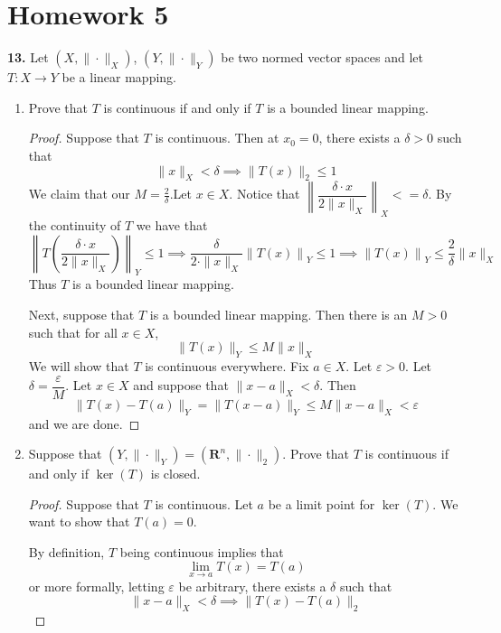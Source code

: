 \documentclass{article}
\newcommand{\R}{\mathbf{R}}
\theoremstyle{plain} %
\numberwithin{thm}{section} %
\theoremstyle{definition}
\begin{document}
    \setcounter{section}{4}
    \section{Homework 5}
    \noindent\textbf{13.} Let $(X,\|\cdot\|_X)$, $(Y,\|\cdot\|_Y)$ be two normed vector spaces and let $T:X\rightarrow Y$ be a linear mapping. %
    \begin{enumerate}[label=(\alph*)]
        \item Prove that $T$ is continuous if and only if $T$ is a bounded linear mapping.
        
        \begin{proof}
            Suppose that \(T\) is continuous. Then at \(x_0 = 0\), there exists a \(\delta >0\) such that
            \[
                \|x\| _X < \delta \implies \|T(x)\| _2 \leq 1
            \]
            We claim that our \(M = \frac{2}{\delta}\).Let \(x \in X\). Notice that \(\left\lVert\dfrac{\delta \cdot x}{2\|x\| _X}\right\rVert _X <= \delta\). By the continuity of \(T\) we have that
            \[
                \left\lVert T\left(\dfrac{\delta \cdot x}{2\|x\| _X} \right)\right\rVert _Y \leq 1 \implies \dfrac{\delta}{2\cdot \|x\| _X}\left\lVert T\left(x\right) \right\rVert _Y \leq 1 \implies \left\lVert T\left(x\right) \right\rVert _Y\leq \dfrac{2}{\delta}\|x\| _X
            \]
            Thus \(T\) is a bounded linear mapping.

            Next, suppose that \(T\) is a bounded linear mapping. Then there is an \(M > 0\) such that for all \(x \in X\),
            \[
                \|T(x)\|_Y \leq M\|x\| _X
            \]
            We will show that \(T\) is continuous everywhere. Fix \(a \in X\). Let \(\varepsilon > 0\). Let \(\delta = \dfrac{\varepsilon}{M}\). Let \(x \in X\) and suppose that \(\|x - a\| _X < \delta\). Then
            \[
                \|T(x) - T(a)\| _Y = \|T(x-a)\| _Y \leq M\|x-a\| _X < \varepsilon
            \]
            and we are done. 
        \end{proof}
        
        \item Suppose that $(Y,\|\cdot\|_Y)=(\R^n,\|\cdot\|_2)$. Prove that $T$ is continuous if and only if $\ker(T)$ is closed.
        \begin{proof}
            Suppose that \(T\) is continuous. Let \(a\) be a limit point for \(\ker (T)\). We want to show that \(T(a)=0\). 
            
            By definition, \(T\) being continuous implies that
            \[
                \lim_{x \to a} T(x) = T(a)
            \]
            or more formally, letting \(\varepsilon\) be arbitrary, there exists a \(\delta\) such that
            \[
                \|x - a\| _X < \delta \implies \|T(x) - T(a)\| _2
            \]


\end{proof}
\end{enumerate}
\end{document}
